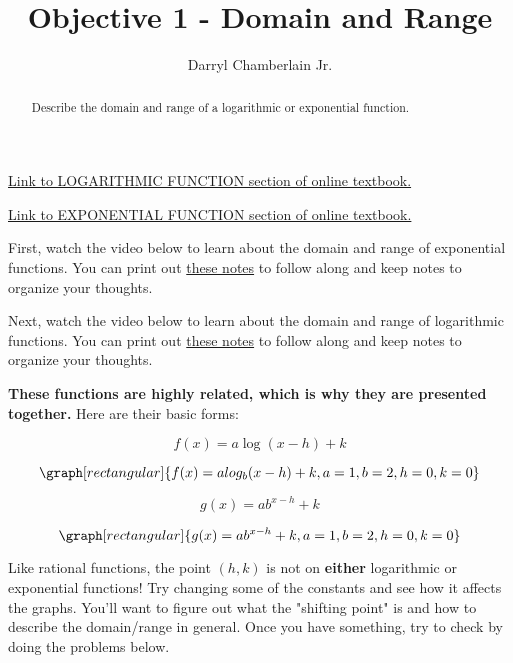 \documentclass{ximera}
\author{Darryl Chamberlain Jr.}
\title{Objective 1 - Domain and Range}
\begin{document}
\begin{abstract}
Describe the domain and range of a logarithmic or exponential function.
\end{abstract}
\maketitle

\href{https://cnx.org/contents/mwjClAV_@8.1:REGENe1G@20/Graphs-of-Logarithmic-Functions}{Link to LOGARITHMIC FUNCTION section of online textbook.}

\href{https://cnx.org/contents/mwjClAV_@8.1:c8aEyW2u@19/Graphs-of-Exponential-Functions}{Link to EXPONENTIAL FUNCTION section of online textbook.}


First, watch the video below to learn about the domain and range of exponential functions. You can print out \href{http://people.clas.ufl.edu/dchamberlain31/files/Objective-1A-Domain-and-Range-Exp.pdf}{these notes} to follow along and keep notes to organize your thoughts.


Next, watch the video below to learn about the domain and range of logarithmic functions. You can print out \href{http://people.clas.ufl.edu/dchamberlain31/files/Objective-1B-Domain-and-Range-Log.pdf}{these notes} to follow along and keep notes to organize your thoughts.


\textbf{These functions are highly related, which is why they are presented together.} Here are their basic forms:

$$ f(x) = a\log{(x-h)} + k $$

\[
\graph[rectangular]{f(x)= a log_b{(x-h)} + k, a=1, b=2, h=0, k=0}
\]

$$ g(x) = a b^{x-h} + k $$

\[
\graph[rectangular]{g(x) = a b^{x-h} + k, a=1, b=2, h=0, k=0}
\]

Like rational functions, the point $(h, k)$ is not on \textbf{either} logarithmic or exponential functions! Try changing some of the constants and see how it affects the graphs. You'll want to figure out what the "shifting point" is and how to describe the domain/range in general. Once you have something, try to check by doing the problems below. 

\end{document}
